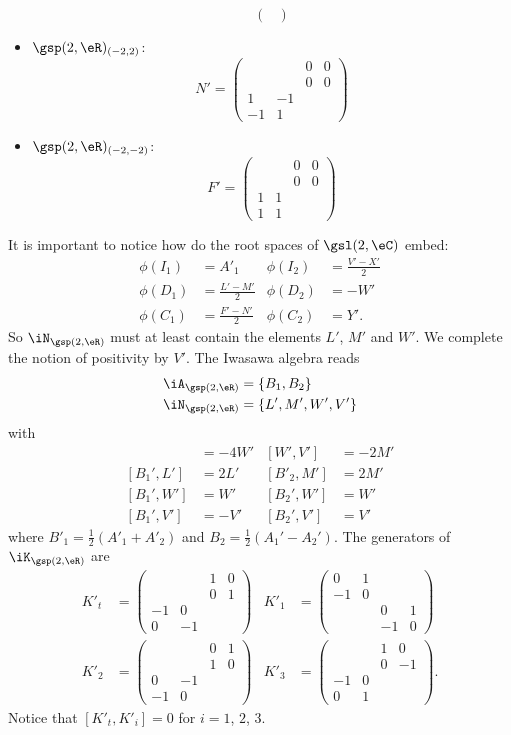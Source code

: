 \begin{itemize}
\[\begin{pmatrix}
\end{pmatrix}
\]
\item $\gsp(2,\eR)_{(-2,2)}$:
\[
  N'=\begin{pmatrix}
&&0&0\\&&0&0\\
1&-1\\
-1&1
\end{pmatrix}
\]
\item $\gsp(2,\eR)_{(-2,-2)}$:
\[
  F'=\begin{pmatrix}
&&0&0\\
&&0&0\\
1&1\\
1&1
\end{pmatrix}
\]
\end{itemize}
It is important to notice how do the root spaces of $\gsl(2,\eC)$ embed:
\begin{align}
\phi(I_1)&=A'_1	&\phi(I_2)&=\frac{ V'-X' }{ 2 }\\
\phi(D_1)&=\frac{ L'-M' }{2}	&\phi(D_2)&=-W'\\
\phi(C_1)&=\frac{ F'-N' }{2}	&\phi(C_2)&=Y'.
\end{align}
So $\iN_{\gsp(2,\eR)}$ must at least contain the elements $L'$, $M'$ and $W'$. We complete the notion of positivity by $V'$. The Iwasawa algebra reads
\[
\begin{split}
\iA_{\gsp(2,\eR)}&=\{ B_1,B_2 \}\\
\iN_{\gsp(2,\eR)}&=\{ L',M',W',V' \}
\end{split}
\]
with
\begin{align*}
[L',V']&=-4W'	&[W',V']&=-2M'\\
[B_1',L']&=2L'	&[B'_2,M']&=2M'\\
[B_1',W']&=W'	&[B_2',W']&=W'\\
[B_1',V']&=-V'	&[B_2',V']&=V'
\end{align*}
where $B'_1=\frac{ 1 }{2}(A'_1+A'_2)$ and $B_2=\frac{ 1 }{2}(A_1'-A_2')$. The generators of $\iK_{\gsp(2,\eR)}$ are
\begin{align*}
K'_t&=
\begin{pmatrix}
&&1&0\\
&&0&1\\
-1&0\\
0&-1
\end{pmatrix}
	&K'_1&=
\begin{pmatrix}
0&1\\-1&0\\
&&0&1\\
&&-1&0
\end{pmatrix}\\
K'_2&=
\begin{pmatrix}
&&0&1\\&&1&0\\0&-1\\-1&0
\end{pmatrix}
	&K'_3&=
\begin{pmatrix}
&&1&0\\
&&0&-1\\
-1&0\\
0&1
\end{pmatrix}.
\end{align*}
Notice that $[K'_t,K'_i]=0$ for $i=1$, $2$, $3$.


